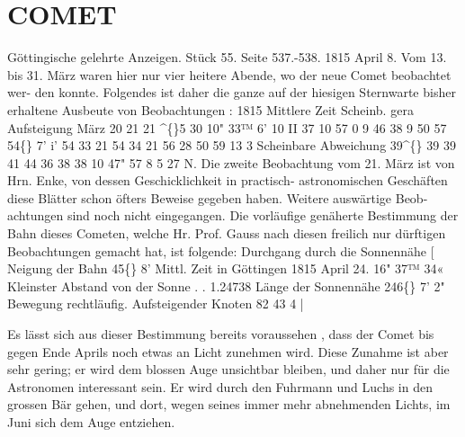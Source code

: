 \documentclass[12pt,a4paper]{article}
\newcommand{\degree}{\textdegree}
\begin{document}
\section*{COMET}
Göttingische  gelehrte  Anzeigen.     Stück  55.     Seite  537.-538.     1815  April  8. 
Vom  13.  bis  31.  März  waren  hier  nur  vier  heitere  Abende,  wo  der  neue  Comet  beobachtet  wer- 
den konnte.  Folgendes  ist  daher  die  ganze  auf  der  hiesigen  Sternwarte  bisher  erhaltene  Ausbeute  von 
Beobachtungen : 
1815 
Mittlere  Zeit Scheinb.  gera 
Aufsteigung 
März  20 
21 
21 
\textasciicircum\{\}5 
30 
10"  33™    6' 
10    II    37 
10    57      0 
9     46     38 
9     50     57 
54\degree\{\}  7'  i' 
54  33  21 
54  34  21 
56     28     50 
59     13       3 
Scheinbare 
Abweichung 
39\textasciicircum\{\} 
39 
39 
41 
44 
36 
38 
38 
10 
47" 
57 
8 
5 
27 
N. 
Die  zweite  Beobachtung  vom  21.  März  ist  von  Hrn.  Enke,  von  dessen  Geschicklichkeit  in  practisch- 
astronomischen  Geschäften  diese  Blätter  schon  öfters  Beweise  gegeben  haben.  Weitere  auswärtige  Beob- 
achtungen sind  noch  nicht  eingegangen. 
Die  vorläufige  genäherte  Bestimmung  der  Bahn  dieses  Cometen,  welche  Hr.  Prof.  Gauss  nach 
diesen  freilich  nur  dürftigen  Beobachtungen  gemacht  hat,  ist  folgende: 
Durchgang  durch  die  Sonnennähe  [  
Neigung  der  Bahn   
45\degree\{\}     8' 
Mittl.  Zeit  in  Göttingen  1815  April  24.  16"  37™  34«     Kleinster  Abstand  von  der  Sonne  .     .      1.24738 
Länge  der  Sonnennähe   
246\degree\{\}     7'     2"   Bewegung  rechtläufig. 
Aufsteigender  Knoten   
82    43      4    | 


\newpage
Es  lässt  sich  aus  dieser  Bestimmung  bereits  voraussehen ,  dass  der  Comet  bis  gegen  Ende  Aprils 
noch  etwas  an  Licht  zunehmen  wird.  Diese  Zunahme  ist  aber  sehr  gering;  er  wird  dem  blossen  Auge 
unsichtbar  bleiben,  und  daher  nur  für  die  Astronomen  interessant  sein.  Er  wird  durch  den  Fuhrmann 
und  Luchs  in  den  grossen  Bär  gehen,  und  dort,  wegen  seines  immer  mehr  abnehmenden  Lichts,  im 
Juni  sich  dem  Auge  entziehen. 
\end{document}
